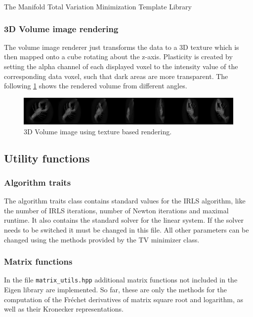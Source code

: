 \begin{chapter}{The Manifold Total Variation Minimization Template Library}
\subsubsection{3D Volume image rendering} %
\label{ssub:3D Volume image rendering}
The volume image renderer just transforms the data to a 3D texture which is then mapped onto a cube rotating about the z-axis.
Plasticity is created by setting the alpha channel of each displayed voxel to the intensity value of the corresponding data voxel, such that dark areas are more transparent.
The following \ref{fig:volume_visualization} shows the rendered volume from different angles.
\begin{figure}[h!]
        \centering
	    \includegraphics[width=1.0\linewidth]{./figures/library/3dvol_seq.png}
	    \caption[3D Volume image renderer]{3D Volume image using texture based rendering. }
	\label{fig:volume_visualization}
\end{figure}


\subsection{Utility functions} %
\label{sub:Utility function}

\subsubsection{Algorithm traits} %
\label{ssub:AlgoTraits}
The algorithm traits class contains standard values for the IRLS algorithm, like the number of IRLS iterations, number of Newton iterations and maximal runtime.
It also contains the standard solver for the linear system. If the solver needs to be switched it must be changed in this file. All other parameters can
be changed using the methods provided by the TV minimizer class.


\subsubsection{Matrix functions} %
\label{ssub:Matrix functions}
In the file \texttt{matrix\_utils.hpp} additional matrix functions not included in the Eigen library are implemented.
So far, these are only the methods for the computation of the Fr\'{e}chet derivatives of matrix square root and logarithm, as well as their
Kronecker representations.


\end{chapter}
